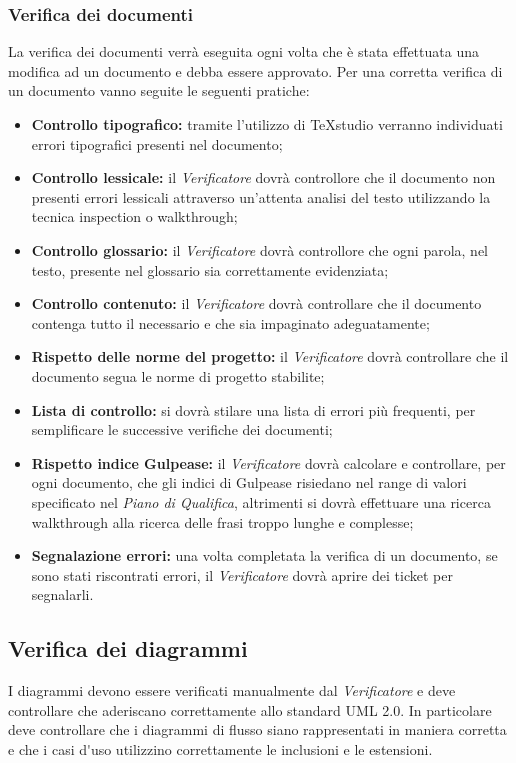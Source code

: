 \subsubsection{Verifica dei documenti}

La verifica dei documenti verrà eseguita ogni volta che è stata effettuata una modifica ad un documento e debba essere approvato.
Per una corretta verifica di un documento vanno seguite le seguenti pratiche:

\begin{itemize}
	\item \textbf{Controllo tipografico: }tramite l'utilizzo di TeXstudio verranno individuati errori tipografici presenti nel documento;
	\item \textbf{Controllo lessicale: }il \textit{Verificatore} dovrà controllore che il documento non presenti errori lessicali attraverso un'attenta analisi del testo utilizzando la tecnica \gls{inspection} o \gls{walkthrough};
	\item \textbf{Controllo glossario: }il \textit{Verificatore} dovrà controllore che ogni parola, nel testo, presente nel glossario sia correttamente evidenziata;
	\item \textbf{Controllo contenuto: }il \textit{Verificatore} dovrà controllare che il documento contenga tutto il necessario e che sia impaginato adeguatamente;
	\item \textbf{Rispetto delle norme del progetto: }il \textit{Verificatore} dovrà controllare che il documento segua le norme di progetto stabilite;
	\item \textbf{Lista di controllo: }si dovrà stilare una lista di errori più frequenti, per semplificare le successive verifiche dei documenti;
	\item \textbf{Rispetto \gls{indice Gulpease}: }il \textit{Verificatore} dovrà calcolare e controllare, per ogni documento, che gli \gls{indici di Gulpease} risiedano nel range di valori specificato nel \textit{Piano di Qualifica}, altrimenti si dovrà effettuare una ricerca \gls{walkthrough} alla ricerca delle frasi troppo lunghe e complesse;
	\item \textbf{Segnalazione errori: }una volta completata la verifica di un documento, se sono stati riscontrati errori, il \textit{Verificatore} dovrà aprire dei \gls{ticket} per segnalarli.
\end{itemize}

\subsection{Verifica dei diagrammi}

I diagrammi devono essere verificati manualmente dal \textit{Verificatore} e deve controllare che aderiscano correttamente allo standard \gls{UML} 2.0.
In particolare deve controllare che i diagrammi di flusso siano rappresentati in maniera corretta e che i \gls{casi d'uso} utilizzino correttamente le inclusioni e le estensioni.

